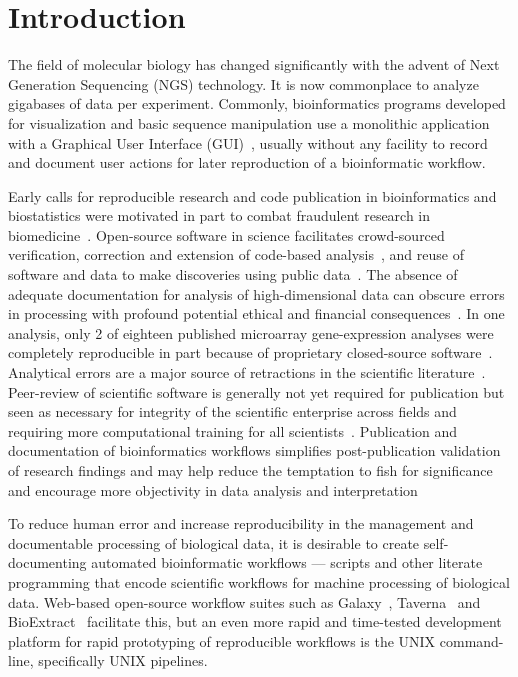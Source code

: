 \documentclass{frontiersSCNS} %
\begin{document}
\section{Introduction}

The field of molecular biology has changed significantly with the
advent of Next Generation Sequencing (NGS) technology. It is now
commonplace to analyze gigabases of data per experiment. Commonly,
bioinformatics programs developed for visualization and basic sequence
manipulation use a monolithic application with a Graphical User
Interface (GUI)~\citep{Smith1994, Rampp2006, Librado01062009}, usually
without any facility to record and document user actions for later
reproduction of a bioinformatic workflow.

Early calls for reproducible research and code publication in
bioinformatics and biostatistics were motivated in part to combat
fraudulent research in biomedicine~\citep{Peng01072009}. Open-source
software in science facilitates crowd-sourced verification, correction
and extension of code-based analysis~\citep{barnes2010publish}, and
reuse of software and data to make discoveries using public
data~\citep{Peng02122011}. The absence of adequate documentation for
analysis of high-dimensional data can obscure errors in processing
with profound potential ethical and financial
consequences~\citep{BaggerlyCoombes2009,hutson2010data,Baggerly01052011,Huang01072013}. In
one analysis, only 2 of eighteen published microarray gene-expression
analyses were completely reproducible in part because of proprietary
closed-source software~\citep{Ioannidis:2008cr}. Analytical errors are
a major source of retractions in the scientific
literature~\citep{Casadevall01092014}. Peer-review of scientific
software is generally not yet required for publication but seen as
necessary for integrity of the scientific enterprise across fields and
requiring more computational training for all
scientists~\citep{Morin13042012,Joppa17052013}. Publication and
documentation of bioinformatics workflows simplifies post-publication
validation of research findings and may help reduce the temptation to
fish for significance and encourage more objectivity in data analysis
and interpretation~\citep{Boulesteix01022010}

To reduce human error and increase reproducibility in the management
and documentable processing of biological data, it is desirable to
create self-documenting automated bioinformatic workflows --- scripts
and other literate programming that encode scientific workflows for
machine processing of biological data. Web-based open-source workflow
suites such as Galaxy~\citep{galaxy14}, Taverna~\citep{CPE:CPE993} and
BioExtract~\citep{Lushbough01072011} facilitate this, but an even more
rapid and time-tested development platform for rapid prototyping of reproducible
workflows is the UNIX command-line, specifically UNIX pipelines.
\end{document}
